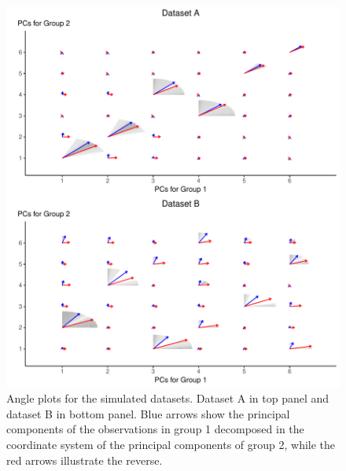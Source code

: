 \documentclass[a4paper,12pt]{article}
\begin{document}
\begin{figure}[H]
\center
\includegraphics[scale=0.8]{Figure3_v3.pdf}
\caption{Angle plots for the simulated datasets. Dataset A in top panel and dataset B in bottom panel. Blue arrows show the principal components of the observations in group 1 decomposed in the coordinate system of the principal components of group 2, while the red arrows illustrate the reverse.}
\label{plot.simAngle}
\end{figure}
\end{document}
